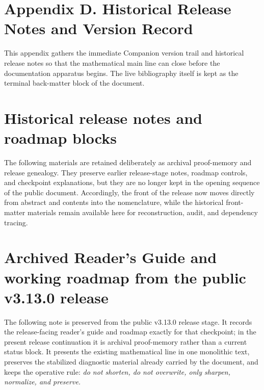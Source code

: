 \section*{Appendix D. Historical Release Notes and Version Record}

This appendix gathers the immediate Companion version trail and historical release notes so that the mathematical main line can close before the documentation apparatus begins. The live bibliography itself is kept as the terminal back-matter block of the document.

\clearpage
\section*{Historical release notes and roadmap blocks}
The following materials are retained deliberately as archival proof-memory and release genealogy.
They preserve earlier release-stage notes, roadmap controls, and checkpoint explanations, but they are no longer kept in the opening sequence of the public document.
Accordingly, the front of the release now moves directly from abstract and contents into the nomenclature, while the historical front-matter materials remain available here for reconstruction, audit, and dependency tracing.

\section*{Archived Reader's Guide and working roadmap from the public v3.13.0 release}

The following note is preserved from the public v3.13.0 release stage. It records the release-facing reader's guide and roadmap exactly for that checkpoint; in the present release continuation it is archival proof-memory rather than a current status block.
It presents the existing mathematical line in one monolithic text, preserves the stabilized diagnostic material already carried by the document, and keeps the operative rule:
\emph{do not shorten, do not overwrite, only sharpen, normalize, and preserve.}

